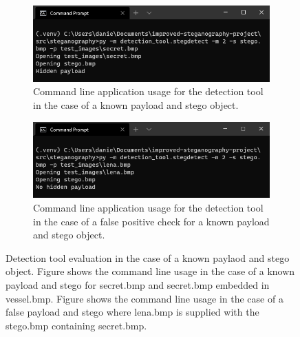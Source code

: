 \documentclass{l4proj}
\begin{document}
\begin{appendices}
\begin{figure}[!h]
    \centering
    \begin{subfigure}[b]{0.75\textwidth}
        \includegraphics[width=\textwidth]{images/evaluation_detection_tool_knownpayload.png}
        \caption{Command line application usage for the detection tool in the case of a known payload and stego object.}
        \label{fig:known_payload_and_stego}
    \end{subfigure}
    \begin{subfigure}[b]{0.75\textwidth}
        \includegraphics[width=\textwidth]{images/knownpayload_false_check.png}
        \caption{Command line application usage for the detection tool in the case of a false positive check for a known payload and stego object.}
        \label{fig:known_payload_and_stego_falsecheck}
    \end{subfigure}
    \caption{Detection tool evaluation in the case of a known paylaod and stego object. Figure  shows the command line usage in the case of a known payload and stego for secret.bmp and secret.bmp embedded in vessel.bmp. Figure  shows the command line usage in the case of a false payload and stego where lena.bmp is supplied with the stego.bmp containing secret.bmp.}
\end{figure}


\end{appendices}
\end{document}
